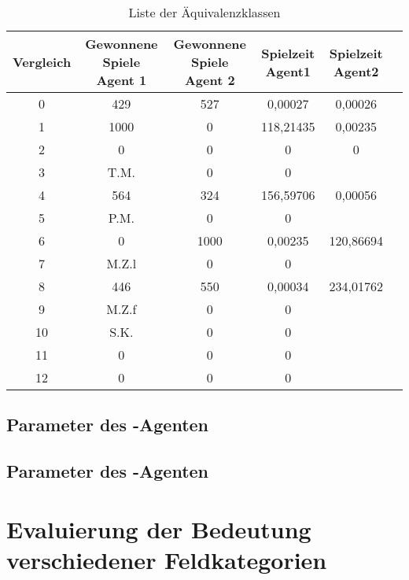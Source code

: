 \begin{table}[ht]
\begin{center}
\begin{tabular}{| c | c | c | c | c | c |} \hline
Vergleich & Gewonnene Spiele Agent 1 & Gewonnene Spiele Agent 2 & Spielzeit Agent1 & Spielzeit Agent2 \\ \hline
\hline
0 & 429 & 527 & 0,00027 & 0,00026  \\ \hline
1 & 1000 & 0 & 118,21435 & 0,00235 \\ \hline
2 & 0 & 0 & 0 & 0  \\ \hline
3 & T.M. & 0 & 0  \\ \hline
4 & 564 & 324 & 156,59706 & 0,00056  \\ \hline
5 & P.M. & 0 & 0  \\ \hline
6 & 0 & 1000 & 0,00235  & 120,86694  \\ \hline
7 & M.Z.l & 0 & 0  \\ \hline
8 & 446 & 550 & 0,00034 &  234,01762 \\ \hline
9 & M.Z.f & 0 & 0  \\ \hline
10 & S.K. & 0 & 0  \\ \hline
11 & 0 & 0 & 0  \\ \hline
12 & 0 & 0 & 0  \\ \hline
\end{tabular}
\end{center}
\caption{Liste der Äquivalenzklassen}
\label{tbl:cmp-results}
\end{table}

\subsection*{Parameter des -Agenten}
\label{eval:agents:params:subsec-mc}

\subsection*{Parameter des -Agenten}
\label{eval:agents:params:subsec-ab}


\section{Evaluierung der Bedeutung verschiedener Feldkategorien}

